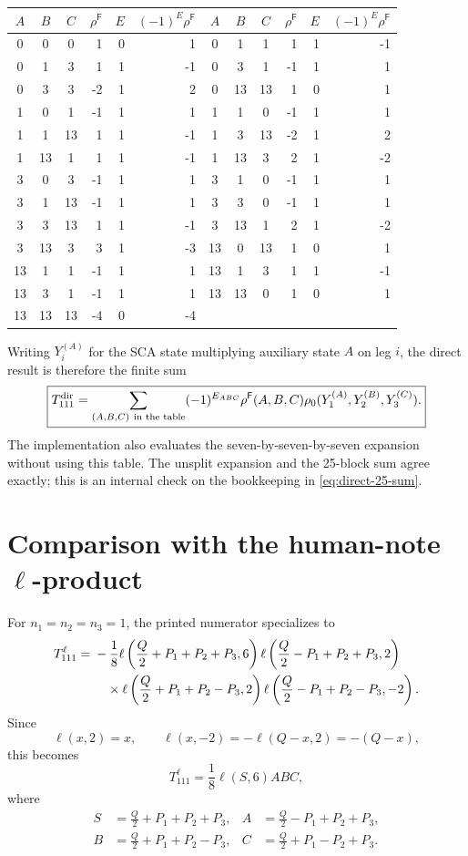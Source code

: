 \documentclass[11pt]{article}
\newcommand{\Ff}{\mathsf F}
\newcommand{\rhof}{\rho^{\Ff}}
\begin{document}
\begingroup\small
\begin{longtable}{ccc|rrr@{\qquad}ccc|rrr}
\toprule
\(A\)&\(B\)&\(C\)&\(\rhof\)&\(E\)&\((-1)^E\rhof\)&
\(A\)&\(B\)&\(C\)&\(\rhof\)&\(E\)&\((-1)^E\rhof\)\\
\midrule
\endhead
0&0&0&1&0&1 & 0&1&1&1&1&-1\\
0&1&3&1&1&-1 & 0&3&1&-1&1&1\\
0&3&3&-2&1&2 & 0&13&13&1&0&1\\
1&0&1&-1&1&1 & 1&1&0&-1&1&1\\
1&1&13&1&1&-1 & 1&3&13&-2&1&2\\
1&13&1&1&1&-1 & 1&13&3&2&1&-2\\
3&0&3&-1&1&1 & 3&1&0&-1&1&1\\
3&1&13&-1&1&1 & 3&3&0&-1&1&1\\
3&3&13&1&1&-1 & 3&13&1&2&1&-2\\
3&13&3&3&1&-3 & 13&0&13&1&0&1\\
13&1&1&-1&1&1 & 13&1&3&1&1&-1\\
13&3&1&-1&1&1 & 13&13&0&1&0&1\\
13&13&13&-4&0&-4 & & & & & \\
\bottomrule
\end{longtable}
\endgroup

Writing \(Y_{i}^{(A)}\) for the SCA state multiplying auxiliary state \(A\)
on leg \(i\), the direct result is therefore the finite sum
\begin{equation}
 \boxed{
 T_{111}^{\rm dir}
 =\sum_{(A,B,C)\ \text{in the table}}
 (-1)^{E_{ABC}}\rhof(A,B,C)
 \rho_0(Y_1^{(A)},Y_2^{(B)},Y_3^{(C)}).}
 \label{eq:direct-25-sum}
\end{equation}
The implementation also evaluates the seven-by-seven-by-seven expansion
without using this table.  The unsplit expansion and the 25-block sum agree
exactly; this is an internal check on the bookkeeping in
\eqref{eq:direct-25-sum}.

\section{Comparison with the human-note \(\ell\)-product}

For \(n_1=n_2=n_3=1\), the printed numerator specializes to
\begin{align}
T_{111}^{\ell}
={}&-\frac18
 \ell\left(\frac Q2+P_1+P_2+P_3,6\right)
 \ell\left(\frac Q2-P_1+P_2+P_3,2\right)\notag\\
&\quad\times
 \ell\left(\frac Q2+P_1+P_2-P_3,2\right)
 \ell\left(\frac Q2-P_1+P_2-P_3,-2\right).
 \label{eq:ell-111-raw}
\end{align}
Since
\begin{equation}
 \ell(x,2)=x,\qquad \ell(x,-2)=-\ell(Q-x,2)=-(Q-x),
\end{equation}
this becomes
\begin{equation}
\boxed{
T_{111}^{\ell}=\frac18\ell(S,6)ABC,}
\label{eq:ell-111-reduced}
\end{equation}
where
\begin{align}
S&=\frac Q2+P_1+P_2+P_3,&
A&=\frac Q2-P_1+P_2+P_3,\\
B&=\frac Q2+P_1+P_2-P_3,&
C&=\frac Q2+P_1-P_2+P_3.
\end{align}
\end{document}

